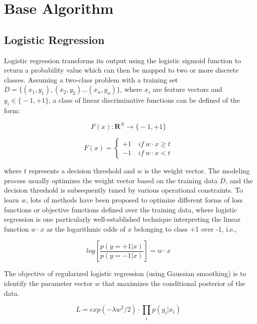 \documentclass[sigconf]{acmart}
\begin{document}
\section{Base Algorithm}
\subsection{Logistic Regression}
\label{subsection:logistic}

Logistic regression \cite{harrell2001ordinal} transforms its output using the logistic sigmoid function to return a probability value which can then be mapped to two or more discrete classes. Assuming a two-class problem with a training set $D = \big\{ (x_1, y_1), (x_2, y_2)...(x_n, y_n) \big\} $, where $x_i$ are feature vectors and $y_i \in \big\{ -1, +1 \big\}$, a class of linear discriminative functions can be defined of the form:

\begin{equation}
F(x): \mathbf{R}^N \rightarrow \big\{ -1, +1 \big\}
\end{equation}

\begin{equation}
F(x) = \begin{cases}
    +1 \quad if \ w \cdot x \geq t \\
    -1 \quad if \ w \cdot x < t 
    \end{cases}
\end{equation}

where $t$ represents a decision threshold and $w$ is the weight vector. The modeling process usually optimizes the weight vector based on the training data $D$, and the decision threshold is subsequently tuned by various operational constraints. To learn $w$, lots of methods have been proposed to optimize different forms of loss functions or objective functions defined over the training data, where logistic regression is one particularly well-established technique interpreting the linear function $w \cdot x$ as the logarithmic odds of $x$ belonging to class +1 over -1, i.e., 

\begin{equation}
log[\frac{p(y=+1|x)}{p(y=-1|x)}] = w \cdot x
\end{equation}

The objective of regularized logistic regression (using Gaussian smoothing) is to identify the parameter vector $w$ that maximizes the conditional posterior of the data.

\begin{equation}
L = exp(-\lambda w^2 /2) \cdot \prod_i p( y_i | x_i )
\end{equation}
\end{document}
